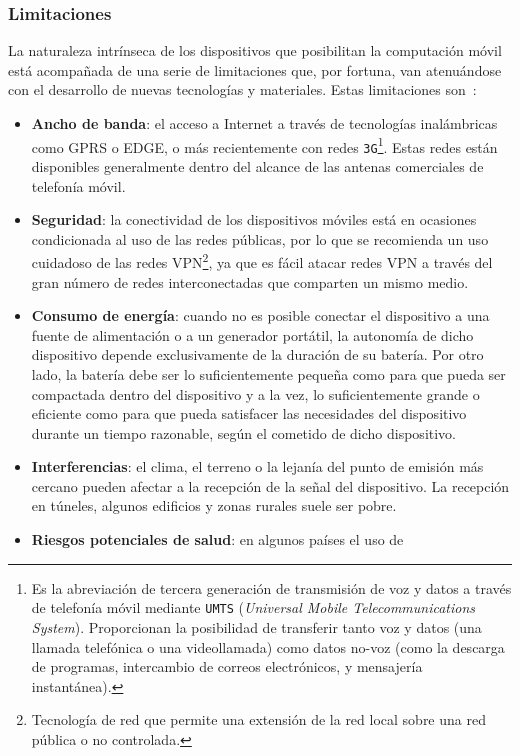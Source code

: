   \subsubsection{Limitaciones}
La naturaleza intrínseca de los dispositivos que posibilitan la computación 
móvil está acompañada de una serie de limitaciones que, por fortuna, van
atenuándose con el desarrollo de nuevas tecnologías y materiales. Estas
limitaciones son~\cite{bib:wikiMobileComputing}:
\begin{itemize}
\item \textbf{Ancho de banda}: el acceso a Internet a través de tecnologías
inalámbricas como \acs{GPRS} o \acs{EDGE}, o más recientemente con redes
\texttt{3G}\footnote{Es la abreviación de tercera generación de transmisión de 
voz y datos a través de telefonía móvil mediante \texttt{UMTS} (\emph{Universal 
Mobile Telecommunications System}). Proporcionan la posibilidad de transferir 
tanto voz y datos (una llamada telefónica o una videollamada) como datos no-voz 
(como la descarga de programas, intercambio de correos electrónicos, y 
mensajería instantánea).}. Estas redes están disponibles generalmente dentro
del alcance de las antenas comerciales de telefonía móvil.
\item \textbf{Seguridad}: la conectividad de los dispositivos móviles está
en ocasiones condicionada al uso de las redes públicas, por lo que se
recomienda un uso cuidadoso de las redes \acs{VPN}\footnote{Tecnología de red
que permite una extensión de la red local sobre una red pública o no
controlada.}, ya que es fácil atacar redes \acs{VPN} a través del gran número
de redes interconectadas que comparten un mismo medio.
\item \textbf{Consumo de energía}: cuando no es posible conectar el dispositivo
a una fuente de alimentación o a un generador portátil, la autonomía de dicho
dispositivo depende exclusivamente de la duración de su batería. Por otro lado,
la batería debe ser lo suficientemente pequeña como para que pueda ser
compactada dentro del dispositivo y a la vez, lo suficientemente grande o
eficiente como para que pueda satisfacer las necesidades del dispositivo
durante un tiempo razonable, según el cometido de dicho dispositivo.
\item \textbf{Interferencias}: el clima, el terreno o la lejanía del punto de
emisión más cercano pueden afectar a la recepción de la señal del dispositivo.
La recepción en túneles, algunos edificios y zonas rurales suele ser pobre.
\item \textbf{Riesgos potenciales de salud}: en algunos países el uso de

\end{itemize}
